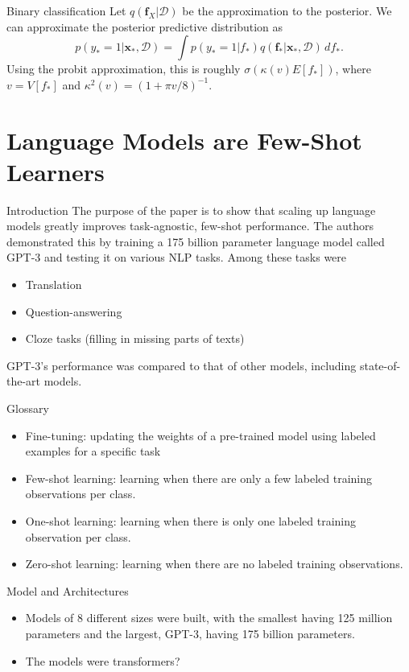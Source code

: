 \documentclass{beamer}
\begin{document}
\begin{frame}{Binary classification}
    Let $q(\boldsymbol{f}_X | \mathcal{D})$ be the approximation to the posterior. We can approximate the posterior predictive distribution as
    \[
    p(y_* = 1 | \boldsymbol{x}_*, \mathcal{D}) = \int p(y_* = 1 | f_*)q(\boldsymbol{f}_* | \boldsymbol{x}_*, \mathcal{D})\,df_*.
    \]
    Using the probit approximation, this is roughly $\sigma(\kappa(v)E[f_*])$, where $v = V[f_*]$ and $\kappa^2(v) = (1 + \pi v / 8)^{-1}$.
\end{frame}

\section{Language Models are Few-Shot Learners}

\begin{frame}{Introduction}
    The purpose of the paper is to show that scaling up language models greatly improves task-agnostic, few-shot performance. The authors demonstrated this by training a 175 billion parameter language model called GPT-3 and testing it on various NLP tasks. Among these tasks were
    \begin{itemize}
        \item Translation
        \item Question-answering
        \item Cloze tasks (filling in missing parts of texts)
    \end{itemize}
    GPT-3's performance was compared to that of other models, including state-of-the-art models.
\end{frame}

\begin{frame}{Glossary}
    \begin{itemize}
        \item Fine-tuning: updating the weights of a pre-trained model using labeled examples for a specific task
        \item Few-shot learning: learning when there are only a few labeled training observations per class.
        \item One-shot learning: learning when there is only one labeled training observation per class.
        \item Zero-shot learning: learning when there are no labeled training observations.
    \end{itemize}
\end{frame}

\begin{frame}{Model and Architectures}
    \begin{itemize}
        \item Models of 8 different sizes were built, with the smallest having 125 million parameters and the largest, GPT-3, having 175 billion parameters.
        \item The models were transformers?
    \end{itemize}
\end{frame}
\end{document}
